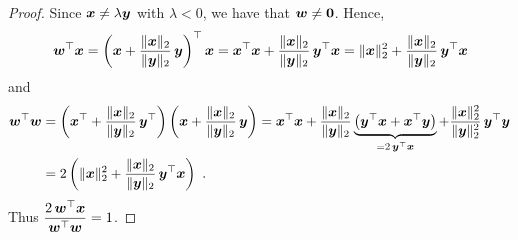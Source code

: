 \begin{proof}
Since $\bm{x} \neq \lambda \bm{y}$ with $\lambda < 0$, we have that
$\bm{w} \neq \bm{0}$.   Hence,
\[
\bm{w}^\top\bm{x} =
\left( \bm{x} + \frac{\|\bm{x}\|_2}{\|\bm{y}\|_2} \, \bm{y} \right)^\top
\bm{x}
= \bm{x}^\top \bm{x}
+ \frac{\|\bm{x}\|_2}{\|\bm{y}\|_2} \, \bm{y}^\top \bm{x}
= \|\bm{x}\|_2^2+ \frac{\|\bm{x}\|_2}{\|\bm{y}\|_2} \, \bm{y}^\top \bm{x}
\]
and
\begin{align*}
\bm{w}^\top\bm{w} &= 
\left(\bm{x}^\top + \frac{\|\bm{x}\|_2}{\|\bm{y}\|_2}\, \bm{y}^\top \right)
\left(\bm{x} + \frac{\|\bm{x}\|_2}{\|\bm{y}\|_2} \, \bm{y} \right)
= \bm{x}^\top \bm{x} + \frac{\|\bm{x}\|_2}{\|\bm{y}\|_2}
\underbrace{\left( \bm{y}^\top\bm{x} + \bm{x}^\top\bm{y} \right)
}_{= 2\, \bm{y}^\top\bm{x}}
+ \frac{\|\bm{x}\|_2^2}{\|\bm{y}\|_2^2} \, \bm{y}^\top \bm{y} \\
&= 2 \left( \|\bm{x}\|_2^2 +
\frac{\|\bm{x}\|_2}{\|\bm{y}\|_2}\, \bm{y}^\top\bm{x}\right) \ .
\end{align*}
Thus $\displaystyle \frac{2\,\bm{w}^\top \bm{x}}{\bm{w}^\top\bm{w}} = 1$.
\end{proof}

